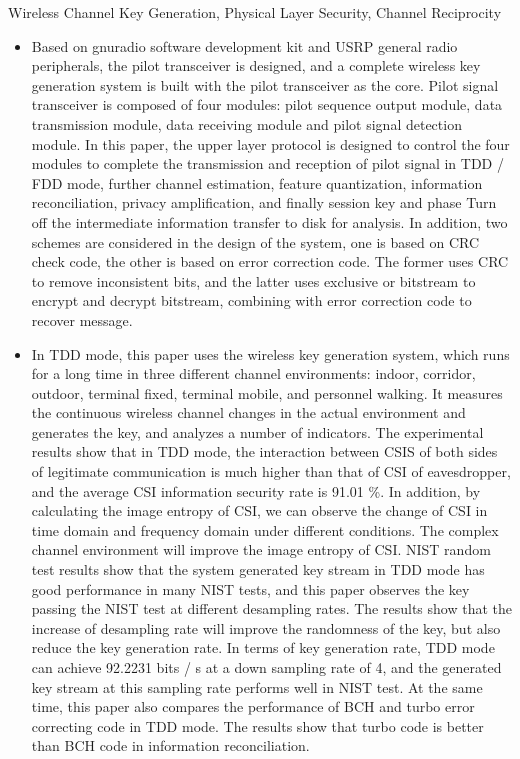 \documentclass[master]{seuthesis} %
\begin{document}
\begin{englishabstract}{Wireless Channel Key Generation, Physical Layer Security, Channel Reciprocity}
    \begin{itemize}
        \item Based on gnuradio software development kit and USRP general radio peripherals, the pilot transceiver is designed, and a complete wireless key generation system is built with the pilot transceiver as the core. Pilot signal transceiver is composed of four modules: pilot sequence output module, data transmission module, data receiving module and pilot signal detection module. In this paper, the upper layer protocol is designed to control the four modules to complete the transmission and reception of pilot signal in TDD / FDD mode, further channel estimation, feature quantization, information reconciliation, privacy amplification, and finally session key and phase Turn off the intermediate information transfer to disk for analysis. In addition, two schemes are considered in the design of the system, one is based on CRC check code, the other is based on error correction code. The former uses CRC to remove inconsistent bits, and the latter uses exclusive or bitstream to encrypt and decrypt bitstream, combining with error correction code to recover message.
        \item In TDD mode, this paper uses the wireless key generation system, which runs for a long time in three different channel environments: indoor, corridor, outdoor, terminal fixed, terminal mobile, and personnel walking. It measures the continuous wireless channel changes in the actual environment and generates the key, and analyzes a number of indicators. The experimental results show that in TDD mode, the interaction between CSIS of both sides of legitimate communication is much higher than that of CSI of eavesdropper, and the average CSI information security rate is 91.01 \%. In addition, by calculating the image entropy of CSI, we can observe the change of CSI in time domain and frequency domain under different conditions. The complex channel environment will improve the image entropy of CSI. NIST random test results show that the system generated key stream in TDD mode has good performance in many NIST tests, and this paper observes the key passing the NIST test at different desampling rates. The results show that the increase of desampling rate will improve the randomness of the key, but also reduce the key generation rate. In terms of key generation rate, TDD mode can achieve 92.2231 bits / s at a down sampling rate of 4, and the generated key stream at this sampling rate performs well in NIST test. At the same time, this paper also compares the performance of BCH and turbo error correcting code in TDD mode. The results show that turbo code is better than BCH code in information reconciliation.

\end{itemize}
\end{englishabstract}
\end{document}
